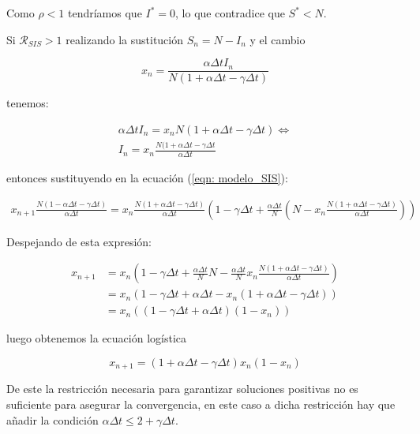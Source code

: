 Como $\rho < 1$ tendríamos que $I^*=0$, lo que contradice que $S^*<N$.

Si $\mathcal{R}_{SIS}>1$ realizando la sustitución $S_n=N-I_n$ y el cambio

$$x_n=\frac{\alpha \Delta t I_n}{N(1+\alpha \Delta t - \gamma \Delta t)}$$

tenemos:

\begin{equation}
\begin{aligned}
\alpha\Delta t I_n = x_nN(1+\alpha\Delta t-\gamma\Delta t) \Leftrightarrow \\
I_n = x_n\frac{N(1+\alpha\Delta t - \gamma\Delta t}{\alpha\Delta t}
\end{aligned}
\end{equation}

entonces sustituyendo en la ecuación (\ref{eqn: modelo_SIS}):

\begin{equation}
\begin{aligned}
x_{n+1}\frac{N(1-\alpha\Delta t-\gamma\Delta t)}{\alpha \Delta t} = x_n\frac{N(1+\alpha\Delta t-\gamma \Delta t)}{\alpha\Delta t}\left( 1-\gamma\Delta t+\frac{\alpha\Delta t}{N}\left(N-x_n\frac{N(1+\alpha\Delta t-\gamma\Delta t)}{\alpha\Delta t}\right) \right)
\end{aligned}
\end{equation}

Despejando de esta expresión:

\begin{equation}
\begin{aligned}
x_{n+1} & = x_n\left( 1-\gamma\Delta t+\frac{\alpha\Delta t}{N}N-\frac{\alpha\Delta t}{N}x_n\frac{N(1+\alpha\Delta t -\gamma \Delta t)}{\alpha\Delta t} \right) \\
& = x_n(1-\gamma\Delta t + \alpha\Delta t -x_n(1+\alpha\Delta t -\gamma\Delta t)) \\
& = x_n((1-\gamma\Delta t+\alpha\Delta t)(1-x_n))
\end{aligned}
\end{equation}

luego obtenemos la ecuación logística

$$x_{n+1} = (1+\alpha \Delta t - \gamma \Delta t)x_n(1-x_n)$$

De este la restricción necesaria para garantizar soluciones positivas no es suficiente para asegurar la convergencia, en este caso a dicha restricción hay que añadir la condición $\alpha \Delta t \leq 2+\gamma \Delta t$.


